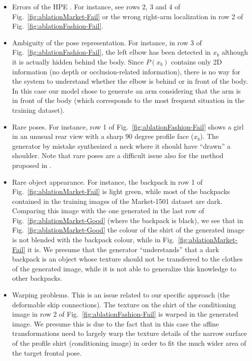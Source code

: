 \documentclass[10pt,twocolumn,letterpaper]{article}
\begin{document}
\begin{itemize}
\item 
Errors of the HPE \cite{Cao}. For instance, see rows 2, 3 and 4 of  Fig.~\ref{fig:ablationMarket-Fail} or the wrong right-arm localization in row 2 of Fig.~\ref{fig:ablationFashion-Fail}.
\item
Ambiguity of the pose representation. 
For instance,
in  row 3 of Fig.~\ref{fig:ablationFashion-Fail},  the left elbow has been detected in $x_b$ although it is actually hidden behind the body. Since $P(x_b)$ contains only 2D information (no depth or occlusion-related information), there is no way for the system to understand whether the elbow is behind or in front of the body.  In this case our model chose to generate an arm considering that the arm is in front of the body (which corresponds to the most frequent situation in the training dataset). 
 \item 
 Rare poses. For instance, row 1 of Fig.~\ref{fig:ablationFashion-Fail} shows a girl in an unusual  rear view with a sharp 90 degree profile face ($x_b$). The generator by mistake synthesized a neck where it should have ``drawn'' a shoulder. Note that rare poses are a difficult issue also for the method proposed in \cite{ma2017pose}.
 \item 
 Rare object appearance. For instance, the backpack in row 1 of Fig.~\ref{fig:ablationMarket-Fail} is light green, while most of the backpacks contained in the training images of the Market-1501 dataset are dark. Comparing this image with the one generated in the last row of Fig.~\ref{fig:ablationMarket-Good} (where the backpack is black), we see that in Fig.~\ref{fig:ablationMarket-Good} the colour of the shirt of the generated image is not blended with the backpack colour, while in Fig.~\ref{fig:ablationMarket-Fail} it is.
 We presume  that the generator ``understands'' that a dark backpack is an object whose texture should not be transferred to the clothes of the generated image, while it is not able to generalize this knowledge to other backpacks. 
 \item 
 Warping problems. This is an issue related to our specific approach (the deformable skip connections). The texture on the shirt of the conditioning image in row 2 of Fig.~\ref{fig:ablationFashion-Fail} is warped in the generated image. We presume this is due to the fact that in this case the affine transformations  need to largely warp the texture details of the narrow surface of the profile shirt (conditioning image) in order to fit the much wider area of the target frontal pose.
\end{itemize}
\end{document}
